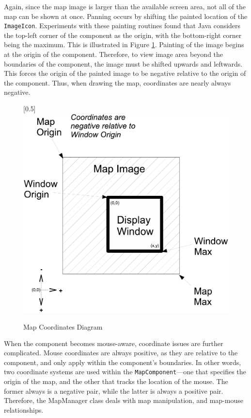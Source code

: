 \documentclass[12pt,letterpaper,titlepage]{article}   %
\begin{document}
Again, since the map image is larger than the available screen area, not
all of the map can be shown at once. Panning occurs by shifting the
painted location of the \texttt{ImageIcon}. Experiments with these painting
routines found that Java considers the top-left corner of the component
as the origin, with the bottom-right corner being the maximum. This is
illustrated in Figure \ref{coordsdiag}. Painting of the image begins at
the origin of the component. Therefore, to view
image area beyond the boundaries of the component, the image must be
shifted upwards and leftwards. This forces the origin of the painted
image to be negative relative to the origin of the component.
Thus, when drawing the map, coordinates are nearly always negative.

\begin{figure}
\begin{center}
  \scalebox{0.5}[0.5]{\includegraphics{images/pdf/map-coords-diagram}}
\end{center}
\caption{Map Coordinates Diagram}
\label{coordsdiag}
\end{figure}

When the component becomes mouse-aware, coordinate issues are further
complicated. Mouse coordinates are always positive, as they are relative
to the component, and only apply within the component's boundaries. In
other words, two coordinate systems are used within the
\texttt{MapComponent}---one that specifies the origin of the map, and the other
that tracks the location of the mouse. The former always is a negative
pair, while the latter is always a positive pair. Therefore, the
MapManager class deals with map manipulation, and map-mouse
relationships.
\end{document}
